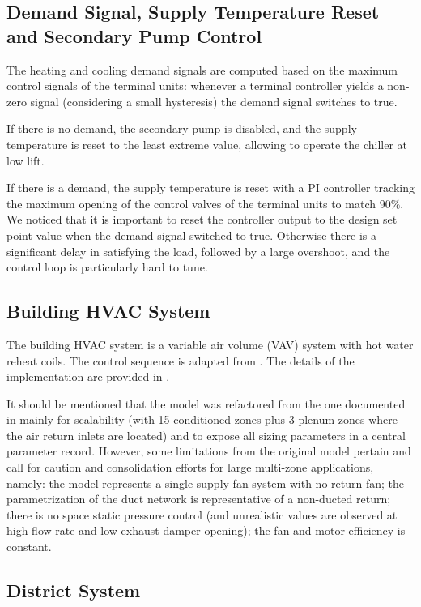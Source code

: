 \subsection{Demand Signal, Supply Temperature Reset and Secondary Pump Control}

The heating and cooling demand signals are computed based on the maximum control signals of the terminal units: whenever a terminal controller yields a non-zero signal (considering a small hysteresis) the demand signal switches to true.

If there is no demand, the secondary pump is disabled, and the supply temperature is reset to the least extreme value, allowing to operate the chiller at low lift.

If there is a demand, the supply temperature is reset with a PI controller tracking the maximum opening of the control valves of the terminal units to match $90\%$.
We noticed that it is important to reset the controller output to the design set point value when the demand signal switched to true. Otherwise there is a significant delay in satisfying the load, followed by a large overshoot, and the control loop is particularly hard to tune.

\subsection{Building HVAC System} \label{sec:vav}

The building HVAC system is a variable air volume (VAV) system with hot water reheat coils. The control sequence is adapted from \cite{ASHRAE2006}. The details of the implementation are provided in \cite{Wetter2021}.

It should be mentioned that the model was refactored from the one documented in \cite{Wetter2021} mainly for scalability (with 15 conditioned zones plus 3 plenum zones where the air return inlets are located) and to expose all sizing parameters in a central parameter record. However, some limitations from the original model pertain and call for caution and consolidation efforts for large multi-zone applications, namely: the model represents a single supply fan system with no return fan; the parametrization of the duct network is representative of a non-ducted return; there is no space static pressure control (and unrealistic values are observed at high flow rate and low exhaust damper opening); the fan and motor efficiency is constant.

\subsection{District System}

